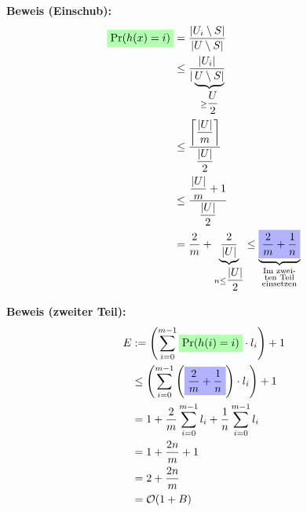 \documentclass{scrartcl}%
\begin{document}
    \vspace*{0.3cm}
    \textbf{\textsf{Beweis (Einschub):}}
    \begin{equation*}
        \begin{flalign}
            \colorbox{green!30}{$\text{Pr}(h(x)=i)$} &= \dfrac{|U_i\setminus S|}{|U\setminus S|}\\\nonumber
            & \leq \dfrac{|U_i|}{|\underbrace{U\setminus S|}_{\geq \dfrac{U}{2}}}\\\nonumber
            &\leq \dfrac{\left\lceil\dfrac{|U|}{m}\right\rceil}{\dfrac{|U|}{2}}\\\nonumber
            &\leq \dfrac{\dfrac{|U|}{m} + 1}{\dfrac{|U|}{2}}\\\nonumber
            &= \dfrac{2}{m} + \underbrace{\dfrac{2}{|U|}}_{n \leq \dfrac{|U|}{2}} \leq \underbrace{\colorbox{blue!30}{$\dfrac{2}{m} + \dfrac{1}{n}$}}_{\substack{\text{Im zwei-} \\ \text{ten Teil} \\ \text{einsetzen}}}
        \end{flalign}
    \end{equation*}

    \vspace*{0.3cm}
    \textbf{\textsf{Beweis (zweiter Teil):}}
    \begin{equation*}
        \begin{flalign}
            E & :=\left(\sum_{i=0}^{m-1}\colorbox{green!30}{$\text{Pr}(h(i)=i)$} \cdot l_i\right) + 1 \\\nonumber
            & \leq \left(\sum_{i=0}^{m-1}\left(\colorbox{blue!30}{$\dfrac{2}{m} + \dfrac{1}{n}$}\right) \cdot l_i\right) + 1 \\\nonumber
            & =  1 + \frac{2}{m} \sum_{i=0}^{m-1}l_i + \frac{1}{n} \sum_{i=0}^{m-1}l_i \\\nonumber
            & =  1 + \frac{2n}{m} +1 \\\nonumber
            & = 2 + \frac{2n}{m} \\\nonumber
            & = \mathcal{O}(1+B)
        \end{flalign}
    \end{equation*}
\end{document}
